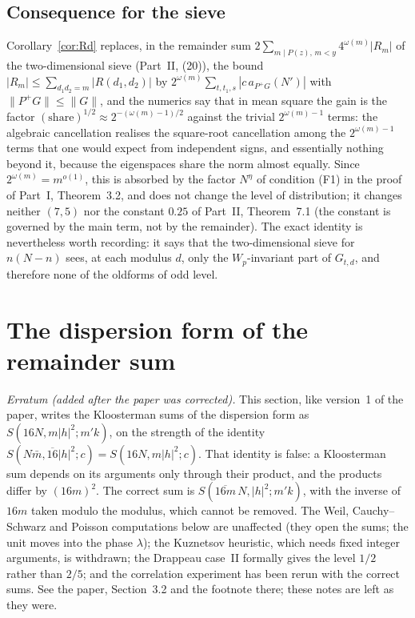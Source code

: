 \documentclass[11pt,a4paper]{article}
\theoremstyle{remark}
\theoremstyle{definition}
\begin{document}
\subsection{Consequence for the sieve}
Corollary~\ref{cor:Rd} replaces, in the remainder sum $2\sum_{m\mid P(z),\,m<y}4^{\omega(m)}|R_m|$ of the two-dimensional sieve (Part~II, (20)), the bound $|R_m|\le\sum_{d_1d_2=m}|R(d_1,d_2)|$ by $2^{\omega(m)}\sum_{t,t_1,s}|c\,a_{P^+G}(N')|$ with $\|P^+G\|\le\|G\|$, and the numerics say that in mean square the gain is the factor $(\text{share})^{1/2}\approx2^{-(\omega(m)-1)/2}$ against the trivial $2^{\omega(m)-1}$ terms: the algebraic cancellation realises the square-root cancellation among the $2^{\omega(m)-1}$ terms that one would expect from independent signs, and essentially nothing beyond it, because the eigenspaces share the norm almost equally. Since $2^{\omega(m)}=m^{o(1)}$, this is absorbed by the factor $N^\eta$ of condition (F1) in the proof of Part~I, Theorem~3.2, and does not change the level of distribution; it changes neither $(7,5)$ nor the constant $0.25$ of Part~II, Theorem~7.1 (the constant is governed by the main term, not by the remainder). The exact identity is nevertheless worth recording: it says that the two-dimensional sieve for $n(N-n)$ sees, at each modulus $d$, only the $W_p$-invariant part of $G_{t,d}$, and therefore none of the oldforms of odd level.

\section{The dispersion form of the remainder sum}

\emph{Erratum (added after the paper was corrected).} This section, like version~1 of the paper, writes the Kloosterman sums of the dispersion form as $S(16N,m|h|^2;m'k)$, on the strength of the identity $S(N\bar m,\overline{16}|h|^2;c)=S(16N,m|h|^2;c)$. That identity is false: a Kloosterman sum depends on its arguments only through their product, and the products differ by $(16m)^2$. The correct sum is $S(\overline{16m}\,N,|h|^2;m'k)$, with the inverse of $16m$ taken modulo the modulus, which cannot be removed. The Weil, Cauchy--Schwarz and Poisson computations below are unaffected (they open the sums; the unit moves into the phase $\lambda$); the Kuznetsov heuristic, which needs fixed integer arguments, is withdrawn; the Drappeau case~II formally gives the level $1/2$ rather than $2/5$; and the correlation experiment has been rerun with the correct sums. See the paper, Section~3.2 and the footnote there; these notes are left as they were.
\end{document}
